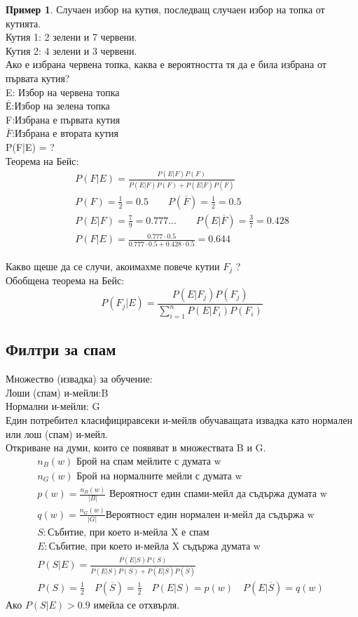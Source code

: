 \documentclass[fleqn, 12pt]{article}
\theoremstyle{definition}
\newtheorem{example}{Пример}[subsection]
\begin{document}
\begin{example}
Случаен избор на кутия, последващ случаен избор на топка от кутията.\\
Кутия 1: 2 зелени и 7 червени. \\
Кутия 2: 4 зелени и 3 червени. \\
Ако е избрана червена топка, каква е вероятността тя да е била избрана от първата кутия?\\
E: Избор на червена топка \\
$\overline{Е}$:Избор на зелена топка\\
F:Избрана е първата кутия\\
$\overline{F}$:Избрана е втората кутия\\
P(F|E) = ? \\
Теорема на Бейс:
\begin{gather*}
P(F|E) = \frac{P(E|F)P(F)}{P(E|F)P(F) + P(E|\overline{F})P(\overline{F})}\\
P(F) = \frac{1}{2}= 0.5 \qquad  P(\overline{F}) = \frac{1}{2}= 0.5 \\
P(E|F) = \frac{7}{9} = 0.777... \qquad P(E|\overline{F}) = \frac{3}{7} = 0.428 \\
P(F|E) = \frac{0.777 \cdot 0.5}{0.777 \cdot 0.5 + 0.428 \cdot 0.5} = 0.644
\end{gather*}
\end{example}
Какво щеше да се случи, акоимахме повече кутии $F_j$ ?\\
Обобщена теорема на Бейс:
$$P(F_j|E) = \frac{P(E|F_j)P(F_j)}{\sum_{i=1}^n P(E|F_i)P(F_i)}$$

\subsection{ Филтри за спам}
Множество (извадка) за обучение:\\
Лоши (спам) и-мейли:B \\
Нормални и-мейли: G\\
Един потребител класифициравсеки и-мейлв обучаващата извадка като нормален или лош (спам) и-мейл.\\
Откриване на думи, които се появяват в множествата B и G. 
\begin{gather*}
n_B (w) \text{ Брой на спам мейлите с думата w} \\
n_G(w) \text{ Брой на нормалните мейли с думата w} \\
p(w) = \frac{n_B(w)}{|B|} \text{ Вероятност един спами-мейл да съдържа думата w} \\
q(w) = \frac{n_G(w)}{|G|} \text{Вероятност един нормален и-мейл да съдържа w} \\
S: \text{Събитие, при което и-мейла X е спам}\\
E: \text{Събитие, при което и-мейла X съдържа думата w} \\
P(S|E) = \frac{P(E|S)P(S)}{P(E|S)P(S) + P(E|\overline{S})P(\overline{S})}\\
P(S) = \frac{1}{2} \quad P(\overline{S}) = \frac{1}{2} \quad P(E|S) = p(w) \quad P(E|\overline{S}) = q(w) 
\end{gather*}
Ако $P(S|E) > 0.9$ имейла се отхвърля. 
\end{document}
